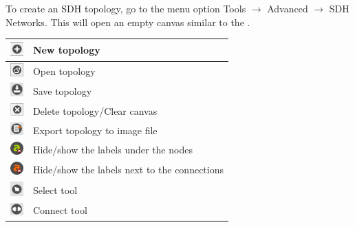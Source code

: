 \documentclass[a4paper]{article}
\begin{document}
		\newpage
		To create an SDH topology, go to the menu option Tools $\rightarrow$ Advanced $\rightarrow$ SDH Networks. This will open an empty canvas similar to the .
		\begin{table}[h!]
			\centering
			\begin{tabular}{lp{10cm}}
				\includegraphics[width=0.5cm]{img/icon_new_element.png} & New topology \\
				\midrule
				\includegraphics[width=0.5cm]{img/icon_open.png} & Open topology \\
				\midrule
				\includegraphics[width=0.5cm]{img/icon_save.png} & Save topology \\
				\midrule
				\includegraphics[width=0.5cm]{img/icon_delete.png} & Delete topology/Clear canvas \\
				\midrule
				\includegraphics[width=0.5cm]{img/icon_export.png} & Export topology to image file \\
				\midrule
				\includegraphics[width=0.5cm]{img/icon_toggle_node_labels.png} & Hide/show the labels under the nodes\\
				\midrule
				\includegraphics[width=0.5cm]{img/icon_toggle_conn_labels.png} & Hide/show the labels next to the connections\\
				\midrule
				\includegraphics[width=0.5cm]{img/icon_select_tool.png} & Select tool \\
				\midrule
				\includegraphics[width=0.5cm]{img/icon_connect_tool.png} & Connect tool \\

\end{tabular}
\end{table}
\end{document}
